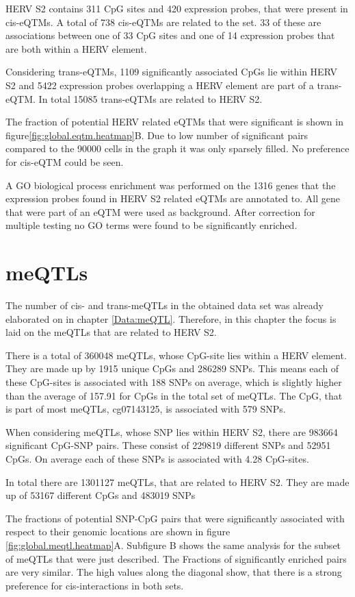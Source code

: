 \documentclass[a4paper,12pt,twoside,openright]{report}
\begin{document}
HERV S2 contains 311 CpG sites and 420 expression probes, that were present in cis-eQTMs. A total of 738 cis-eQTMs are related to the set. 33 of these are associations between one of 33 CpG sites and one of 14 expression probes that are both  within a HERV element. 

Considering trans-eQTMs, 1109 significantly associated CpGs lie within HERV S2 and 5422 expression probes overlapping a HERV element are part of a trans-eQTM. In total 15085 trans-eQTMs are related to HERV S2.

The fraction of potential HERV related eQTMs that were significant is shown in figure\ref{fig:global.eqtm.heatmap}B. Due to low number of significant pairs compared to the 90000 cells in the graph it was only sparsely filled. No preference for cis-eQTM could be seen. 

A GO biological process enrichment was performed on the 1316 genes that the expression probes found in HERV S2 related eQTMs are annotated to. All gene that were part of an eQTM were used as background. After correction for multiple testing no GO terms were found to be significantly enriched. 

\section{meQTLs}
\label{Results:meQTLs}
The number of cis- and trans-meQTLs in the obtained data set was already elaborated on in chapter \ref{Data:meQTL}. Therefore, in this chapter the focus is laid on the meQTLs that are related to HERV S2.

There is a total of 360048 meQTLs, whose CpG-site lies within a HERV element. They are made up by 1915 unique CpGs and 286289 SNPs. This means each of these CpG-sites is associated with 188 SNPs on average, which is slightly higher than the average of 157.91 for CpGs in the total set of meQTLs. The CpG, that is part of most meQTLs, cg07143125, is associated with 579 SNPs. 

When considering meQTLs, whose SNP lies within HERV S2, there are 983664 significant CpG-SNP pairs. These consist of 229819 different SNPs and 52951 CpGs. On average each of these SNPs is associated with 4.28 CpG-sites. 

In total there are 1301127 meQTLs, that are related to HERV S2. They are made up of 53167 different CpGs and 483019 SNPs

The fractions of potential SNP-CpG pairs that were significantly associated with respect to their genomic locations are shown in figure \ref{fig:global.meqtl.heatmap}A. Subfigure B shows the same analysis for the subset of meQTLs that were just described. The Fractions of significantly enriched pairs are very similar. The high values along the diagonal show, that there is a strong preference for cis-interactions in both sets. 
\end{document}
